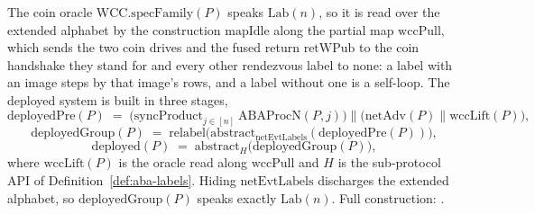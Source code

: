 \begin{definition}
  \label{def:aba-deployed}
  \leanok
  The coin oracle $\mathrm{WCC.specFamily}(P)$ speaks $\mathrm{Lab}(n)$, so it is read over the extended alphabet by the construction $\mathrm{mapIdle}$ along the partial map $\mathrm{wccPull}$, which sends the two coin drives and the fused return $\mathrm{retWPub}$ to the coin handshake they stand for and every other rendezvous label to none: a label with an image steps by that image's rows, and a label without one is a self-loop.
  The deployed system is built in three stages,
  \[
    \mathrm{deployedPre}(P) \;=\;
      \bigl(\mathrm{syncProduct}_{j \in [n]}\ \mathrm{ABAProcN}(P,j)\bigr)
        \parallel \bigl(\mathrm{netAdv}(P) \parallel \mathrm{wccLift}(P)\bigr),
  \]
  \[
    \mathrm{deployedGroup}(P) \;=\;
      \mathrm{relabel}\bigl(
        \mathrm{abstract}_{\mathrm{netEvtLabels}}(\mathrm{deployedPre}(P))\bigr),
  \]
  \[
    \mathrm{deployed}(P) \;=\; \mathrm{abstract}_H\bigl(\mathrm{deployedGroup}(P)\bigr),
  \]
  where $\mathrm{wccLift}(P)$ is the oracle read along $\mathrm{wccPull}$ and $H$ is the sub-protocol API of Definition~\ref{def:aba-labels}.
  Hiding $\mathrm{netEvtLabels}$ discharges the extended alphabet, so $\mathrm{deployedGroup}(P)$ speaks exactly $\mathrm{Lab}(n)$.
  Full construction: .
\end{definition}

